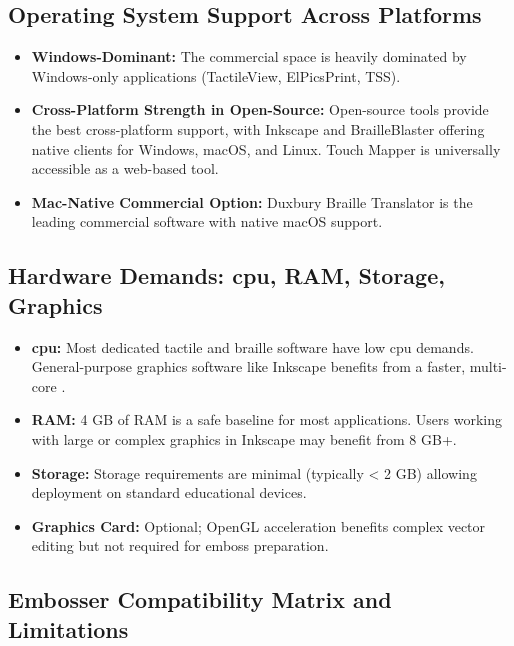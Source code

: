 \subsection{Operating System Support Across Platforms}\label{ch14:ssec:os-support}
\begin{itemize}
	\item \textbf{Windows-Dominant:} The commercial  space is heavily dominated by Windows-only applications (TactileView, ElPicsPrint, TSS).
	\item \textbf{Cross-Platform Strength in Open-Source:} Open-source tools provide the best cross-platform support, with Inkscape and BrailleBlaster offering native clients for Windows, macOS, and Linux. Touch Mapper is universally accessible as a web-based tool.
	\item \textbf{Mac-Native Commercial Option:} Duxbury Braille Translator is the leading commercial software with native macOS support.
\end{itemize}

\subsection{Hardware Demands: \gls{cpu}, RAM, Storage, Graphics}\label{ch14:ssec:hardware-demands}
\begin{itemize}
	\item \textbf{\gls{cpu}:} Most dedicated tactile and braille software have low \gls{cpu} demands. General-purpose graphics software like Inkscape benefits from a faster, multi-core .
	\item \textbf{RAM:} 4 GB of RAM is a safe baseline for most applications. Users working with large or complex graphics in Inkscape may benefit from 8 GB+.
	\item \textbf{Storage:} Storage requirements are minimal (typically < 2 GB) allowing deployment on standard educational devices.
	\item \textbf{Graphics Card:} Optional; OpenGL acceleration benefits complex vector editing but not required for emboss preparation.
\end{itemize}

\subsection{Embosser Compatibility Matrix and Limitations}\label{ch14:ssec:embosser-matrix}

